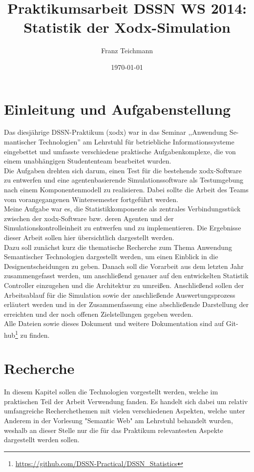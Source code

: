 \documentclass{article}
\title{Praktikumsarbeit DSSN WS 2014: \\ Statistik der Xodx-Simulation}
\author{Franz Teichmann}
\date{\today}
\begin{document}
\maketitle

\tableofcontents
\newpage

\section{Einleitung und Aufgabenstellung}

Das diesjährige DSSN-Praktikum (xodx) war in das Seminar ,,Anwendung Se-mantischer Technologien'' am Lehrstuhl für betriebliche Informationssysteme eingebettet und umfasste verschiedene praktische Aufgabenkomplexe, die von einem unabhängigen Studententeam bearbeitet wurden.\\
Die Aufgaben drehten sich darum, einen Test für die bestehende xodx-Software zu entwerfen und eine agentenbasierende Simulationssoftware als Testumgebung nach einem Komponentenmodell zu realisieren. Dabei sollte die Arbeit des Teams vom vorangegangenen Wintersemester fortgeführt werden.\\
Meine Aufgabe war es, die Statistikkomponente als zentrales Verbindungsstück zwischen der xodx-Software bzw. deren Agenten und der Simulationskontrolleinheit zu entwerfen und zu implementieren. Die Ergebnisse dieser Arbeit sollen hier übersichtlich dargestellt werden.\\
Dazu soll zunächst kurz die thematische Recherche zum Thema Anwendung Semantischer Technologien dargestellt werden, um einen Einblick in die Designentscheidungen zu geben. Danach soll die Vorarbeit aus dem letzten Jahr zusammengefasst werden, um anschließend genauer auf den entwickelten Statistik Controller einzugehen und die Architektur zu umreißen. Anschließend sollen der Arbeitsablauf für die Simulation sowie der anschließende Auswertungsprozess erläutert werden und in der Zusammenfassung eine abschließende Darstellung der erreichten und der noch offenen Zielstellungen gegeben werden.\\
Alle Dateien sowie dieses Dokument und weitere Dokumentation sind auf Git-hub\footnote{\url{https://github.com/DSSN-Practical/DSSN_Statistics}} zu finden.

\section{Recherche}

In diesem Kapitel sollen die Technologien vorgestellt werden, welche im praktischen Teil der Arbeit Verwendung fanden. Es handelt sich dabei um relativ umfangreiche Recherchethemen mit vielen verschiedenen Aspekten, welche unter Anderem in der Vorlesung "Semantic Web" am Lehrstuhl behandelt wurden, weshalb an dieser Stelle nur die für das Praktikum relevantesten Aspekte dargestellt werden sollen.
\end{document}
